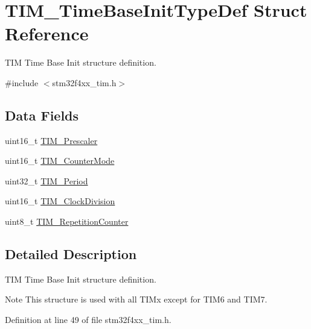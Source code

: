 \hypertarget{struct_t_i_m___time_base_init_type_def}{\section{T\-I\-M\-\_\-\-Time\-Base\-Init\-Type\-Def Struct Reference}
\label{struct_t_i_m___time_base_init_type_def}
}


T\-I\-M Time Base Init structure definition.  




{\ttfamily \#include $<$stm32f4xx\-\_\-tim.\-h$>$}

\subsection*{Data Fields}
\begin{DoxyCompactItemize}
\item 
uint16\-\_\-t \hyperlink{struct_t_i_m___time_base_init_type_def_a30c6857997a4ddd7d3d66fd3a8907c37}{T\-I\-M\-\_\-\-Prescaler}
\item 
uint16\-\_\-t \hyperlink{struct_t_i_m___time_base_init_type_def_adfc97c66bfce30e74ce779ab04c156e9}{T\-I\-M\-\_\-\-Counter\-Mode}
\item 
uint32\-\_\-t \hyperlink{struct_t_i_m___time_base_init_type_def_a642ee05352126af48248167939742034}{T\-I\-M\-\_\-\-Period}
\item 
uint16\-\_\-t \hyperlink{struct_t_i_m___time_base_init_type_def_a2142bf86a7116c8c98ab015d5606fc98}{T\-I\-M\-\_\-\-Clock\-Division}
\item 
uint8\-\_\-t \hyperlink{struct_t_i_m___time_base_init_type_def_a121b27ced71ccb2c85f1d9825ae8d496}{T\-I\-M\-\_\-\-Repetition\-Counter}
\end{DoxyCompactItemize}


\subsection{Detailed Description}
T\-I\-M Time Base Init structure definition. 

\begin{DoxyNote}{Note}
This structure is used with all T\-I\-Mx except for T\-I\-M6 and T\-I\-M7. 
\end{DoxyNote}


Definition at line 49 of file stm32f4xx\-\_\-tim.\-h.



